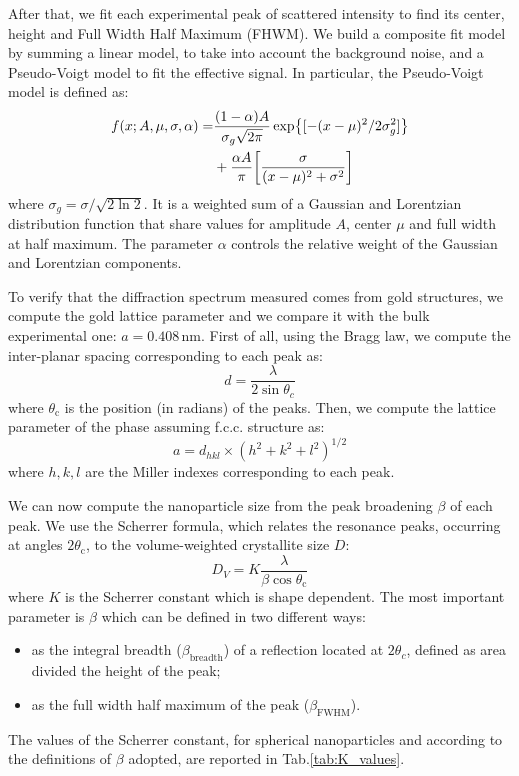 \documentclass[prb,twocolumn]{revtex4-1}
\begin{document}
After that, we fit each experimental peak of  scattered intensity to find its center, height and Full Width Half Maximum (FHWM). 
We build a composite fit model by summing a linear model, to take into account the background noise, and a Pseudo-Voigt model to fit the effective signal. 
In particular, the Pseudo-Voigt model is defined as:
\begin{equation}
\begin{split}
f(x; A, \mu, \sigma, \alpha) 
= & \frac{(1-\alpha)A}{\sigma_g \sqrt{2 \pi}}
\exp{[ - (x-\mu)^2/ 2 \sigma_g^2 ]}  \\
&+ \frac{\alpha A}{\pi}
\qty[ \frac{\sigma}{(x-\mu)^2 + \sigma^2 } ]
\end{split}
\end{equation}
where \( \sigma_g = \sigma/ \sqrt{2 \ln 2}\). It is a weighted sum of a Gaussian and Lorentzian distribution function that share values for amplitude \(A\), center \(\mu\) and full width at half maximum.
The parameter \( \alpha \) controls the relative weight of the Gaussian and Lorentzian components.



To verify that the diffraction spectrum measured comes from gold structures, we compute the gold lattice parameter and we compare it with the bulk experimental one: \(a=0.408\,  \text{nm}\).
First of all, using the Bragg law, we compute the inter-planar spacing corresponding to each peak as:
\begin{equation}
d = \frac{\lambda}{2 \sin \theta_c}
\end{equation} 
where \(\theta_{\text{c}}\) is the position (in radians) of the peaks.
Then, we compute the lattice parameter of the phase assuming f.c.c. structure as:
\begin{equation}
a = d_{hkl} \times (h^2+k^2+l^2 )^{1/2}
\end{equation}
where \(h,k,l\) are the Miller indexes corresponding to each peak.




We can now compute the nanoparticle size from the peak broadening $\beta$ of each peak. We use the Scherrer formula, which relates the resonance peaks, occurring at angles \(2 \theta_{\text{c}} \), to the volume-weighted crystallite size \(D\):
\begin{equation}
D_V = K \frac{\lambda}{\beta \cos \theta_{\text{c}}}
\end{equation}
where \(K\) is the Scherrer constant which is shape dependent.
The most important parameter is \(\beta\) which can be defined in two different ways:
\begin{itemize}
\item as the integral breadth (\(\beta_{\text{breadth}}\)) of a reflection located at \(2\theta_c\), defined as area divided the height of the peak;
\item as the full width half maximum of the peak  (\(\beta_{\text{FWHM}}\)).
\end{itemize}
The values of the Scherrer constant, for spherical nanoparticles and according to the definitions of \(\beta\) adopted, are reported in Tab.\ref{tab:K_values}.
\end{document}
